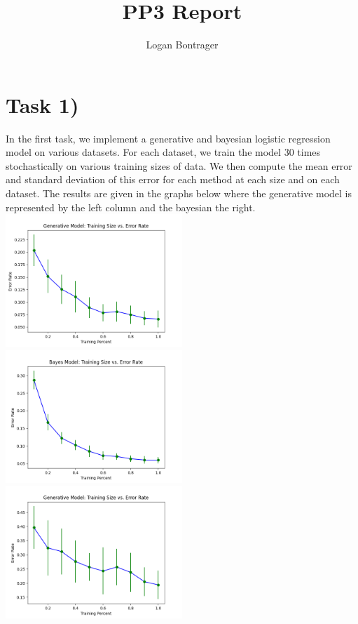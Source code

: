 \documentclass{article}
\begin{document}
\title{PP3 Report}
\author{Logan Bontrager}
\maketitle

\section*{Task 1)}

In the first task, we implement a generative and bayesian logistic regression model on various datasets. For each dataset, we train the model 30 times stochastically on various training sizes of data. We then compute the mean error and standard deviation of this error for each method at each size and on each dataset. The results are given in the graphs below where the generative model is represented by the left column and the bayesian the right.
\\
\includegraphics[width=0.5\textwidth]{../output/generative-A.png}
\includegraphics[width=0.5\textwidth]{../output/bayes-A.png}
\includegraphics[width=0.5\textwidth]{../output/generative-B.png}
\end{document}
